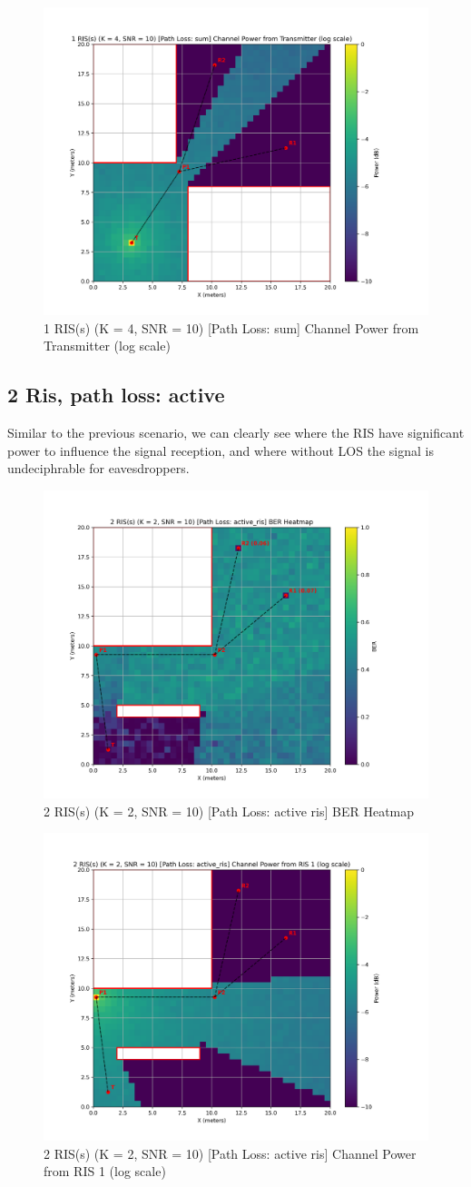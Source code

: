 \begin{figure}[H]
  \centering
  \includegraphics[width=0.45\linewidth]{imgs/heatmap-simulations/1 RIS(s) (K = 4, SNR = 10) [Path Loss_ sum] Channel Power from Transmitter (log scale).png}
  \caption{1 RIS(s) (K = 4, SNR = 10) [Path Loss: sum] Channel Power from Transmitter (log scale)}
\end{figure}

\subsection*{2 Ris, path loss: active}
Similar to the previous scenario, we can clearly see where the RIS have significant power to influence the signal reception, and where without LOS the signal is undeciphrable for eavesdroppers.

\begin{figure}[H]
  \centering
  \includegraphics[width=0.45\linewidth]{imgs/heatmap-simulations/2 RIS(s) (K = 2, SNR = 10) [Path Loss_ active_ris] BER Heatmap.png}
  \caption{2 RIS(s) (K = 2, SNR = 10) [Path Loss: active ris] BER Heatmap}
\end{figure}

\begin{figure}[H]
  \centering
  \includegraphics[width=0.45\linewidth]{imgs/heatmap-simulations/2 RIS(s) (K = 2, SNR = 10) [Path Loss_ active_ris] Channel Power from RIS 1 (log scale).png}
  \caption{2 RIS(s) (K = 2, SNR = 10) [Path Loss: active ris] Channel Power from RIS 1 (log scale)}
\end{figure}

